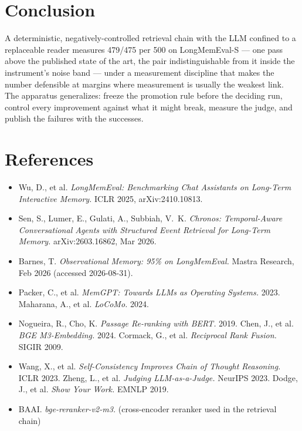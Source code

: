 \documentclass[11pt]{article}
\begin{document}
\section{Conclusion}
A deterministic, negatively-controlled retrieval chain with the LLM confined
to a replaceable reader measures 479/475 per 500 on LongMemEval-S --- one pass
above the published state of the art, the pair indistinguishable from it inside
the instrument's noise band --- under a measurement discipline that makes the number defensible at margins where
measurement is usually the weakest link. The apparatus generalizes: freeze the
promotion rule before the deciding run, control every improvement against what
it might break, measure the judge, and publish the failures with the
successes.

\section*{References}
\begin{itemize}\setlength{\itemsep}{1pt}\setlength{\parskip}{0pt}\setlength{\parsep}{0pt}
\item Wu, D., et al. \emph{LongMemEval: Benchmarking Chat Assistants on
Long-Term Interactive Memory.} ICLR 2025, arXiv:2410.10813.
\item Sen, S., Lumer, E., Gulati, A., Subbiah, V.~K. \emph{Chronos:
Temporal-Aware Conversational Agents with Structured Event Retrieval for
Long-Term Memory.} arXiv:2603.16862, Mar 2026.
\item Barnes, T. \emph{Observational Memory: 95\% on LongMemEval.} Mastra
Research, Feb 2026 (accessed 2026-08-31).
\item Packer, C., et al. \emph{MemGPT: Towards LLMs as Operating Systems.}
2023. \quad Maharana, A., et al. \emph{LoCoMo.} 2024.
\item Nogueira, R., Cho, K. \emph{Passage Re-ranking with BERT.} 2019. \quad
Chen, J., et al. \emph{BGE M3-Embedding.} 2024. \quad Cormack, G., et al.
\emph{Reciprocal Rank Fusion.} SIGIR 2009.
\item Wang, X., et al. \emph{Self-Consistency Improves Chain of Thought
Reasoning.} ICLR 2023. \quad Zheng, L., et al. \emph{Judging LLM-as-a-Judge.}
NeurIPS 2023. \quad Dodge, J., et al. \emph{Show Your Work.} EMNLP 2019.
\item BAAI. \emph{bge-reranker-v2-m3.} (cross-encoder reranker used in the
retrieval chain)
\end{itemize}
\end{document}

